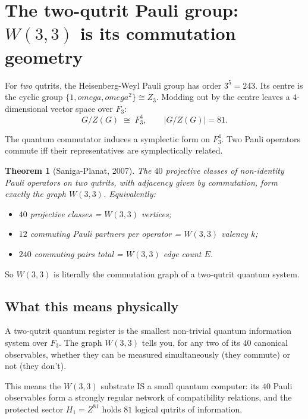 \documentclass[11pt]{article}
\def\mathbb#1{#1}%
\def\textbf#1{#1}%
\def\omega{omega}%
\newtheorem*{theorem}{Theorem}
\newcommand{\W}{W(3,3)}
\begin{document}
\section{\texorpdfstring{The two-qutrit Pauli group: $W(3,3)$ is its commutation geometry}{The two-qutrit Pauli group: W(3,3) is its commutation geometry}}

For \emph{two} qutrits, the Heisenberg-Weyl Pauli group has order $3^5 = 243$. Its centre is the cyclic group $\{1, \omega, \omega^2\} \cong \mathbb{Z}_3$. Modding out by the centre leaves a $4$-dimensional vector space over $\mathbb{F}_3$:
\[
G / Z(G) \;\cong\; \mathbb{F}_3^4, \qquad |G/Z(G)| = 81.
\]

The quantum commutator induces a symplectic form on $\mathbb{F}_3^4$. Two Pauli operators commute iff their representatives are symplectically related.

\begin{theorem}[Saniga-Planat, 2007]
The $40$ projective classes of non-identity Pauli operators on two qutrits, with adjacency given by commutation, form exactly the graph $\W$. Equivalently:
\begin{itemize}[leftmargin=2em]
\item $40$ projective classes = $W(3,3)$ vertices;
\item $12$ commuting Pauli partners per operator = $W(3,3)$ valency $k$;
\item $240$ commuting pairs total = $W(3,3)$ edge count $E$.
\end{itemize}
\end{theorem}

So $W(3,3)$ is literally the commutation graph of a two-qutrit quantum system.

\subsection*{What this means physically}

A two-qutrit quantum register is the smallest non-trivial quantum information system over $\mathbb{F}_3$. The graph $\W$ tells you, for any two of its $40$ canonical observables, whether they can be measured simultaneously (they commute) or not (they don't).

\textbf{This means the $\W$ substrate IS a small quantum computer:} its $40$ Pauli observables form a strongly regular network of compatibility relations, and the protected sector $H_1 = \mathbb{Z}^{81}$ holds $81$ logical qutrits of information.
\end{document}
